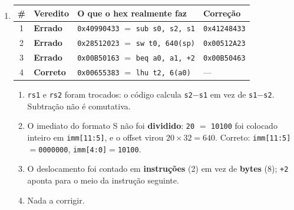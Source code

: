 \documentclass[11pt, a4paper]{article}
\begin{document}
\begin{enumerate}
\item \begin{center}
\small
\begin{tabular}{clll}
\toprule
\# & \textbf{Veredito} & \textbf{O que o hex realmente faz} & \textbf{Corre\c{c}\~{a}o}\\
\midrule
1 & \textbf{Errado} & \texttt{0x40990433} $=$ \texttt{sub s0, s2, s1} & \texttt{0x41248433}\\
2 & \textbf{Errado} & \texttt{0x28512023} $=$ \texttt{sw t0, 640(sp)} & \texttt{0x00512A23}\\
3 & \textbf{Errado} & \texttt{0x00B50163} $=$ \texttt{beq a0, a1, +2} & \texttt{0x00B50463}\\
4 & \textbf{Correto} & \texttt{0x00655383} $=$ \texttt{lhu t2, 6(a0)} & ---\\
\bottomrule
\end{tabular}
\end{center}

\begin{enumerate}
  \item[1.] \texttt{rs1} e \texttt{rs2} foram trocados: o c\'{o}digo calcula \texttt{s2}$-$\texttt{s1} em vez de \texttt{s1}$-$\texttt{s2}. Subtra\c{c}\~{a}o n\~{a}o \'{e} comutativa.
  \item[2.] O imediato do formato S n\~{a}o foi \textbf{dividido}: \texttt{20} $=$ \texttt{10100} foi colocado inteiro em \texttt{imm[11:5]}, e o offset virou $20 \times 32 = 640$. Correto: \texttt{imm[11:5]}$=$\texttt{0000000}, \texttt{imm[4:0]}$=$\texttt{10100}.
  \item[3.] O deslocamento foi contado em \textbf{instru\c{c}\~{o}es} (2) em vez de \textbf{bytes} (8); \texttt{+2} aponta para o meio da instru\c{c}\~{a}o seguinte.
  \item[4.] Nada a corrigir.
\end{enumerate}


\end{enumerate}
\end{document}
